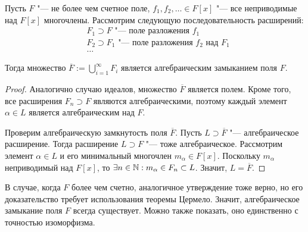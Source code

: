 \begin{proposition}
	Пусть $F$ "--- не более чем счетное поле, $f_1, f_2, \dotsc \in F[x]$ "--- все неприводимые над $F[x]$ многочлены. Рассмотрим следующую последовательность расширений:
	\begin{align*}
		&F_1 \supset F\text{ "--- поле разложения } f_1\\
		&F_2 \supset F_1\text{ "--- поле разложения } f_2 \text{ над } F_1\\
		&\dots
	\end{align*}
	
	Тогда множество $\overline{F} := \bigcup_{i = 1}^\infty F_i$ является алгебраическим замыканием поля $F$.
\end{proposition}

\begin{proof}
	Аналогично случаю идеалов, множество $\overline{F}$ является полем. Кроме того, все расширения $F_n \supset F$ являются алгебраическими, поэтому каждый элемент $\alpha \in L$ является алгебраическим над $F$.
	
	Проверим алгебраическую замкнутость поля $\overline{F}$. Пусть $L \supset \overline{F}$ "--- алгебраическое расширение. Тогда расширение $L \supset F$ "--- тоже алгебраическое. Рассмотрим элемент $\alpha \in L$ и его минимальный многочлен $m_\alpha \in F[x]$. Поскольку $m_\alpha$ неприводимый над $F[x]$, то $\exists n \in \mathbb{N}: m_\alpha \in F_n \subset L$. Значит, $L = \overline{F}$.
\end{proof}

\begin{note}
	В случае, когда $F$ более чем счетно, аналогичное утверждение тоже верно, но его доказательство требует использования теоремы Цермело. Значит, алгебраическое замыкание поля $F$ всегда существует. Можно также показать, оно единственно с точностью изоморфизма.
\end{note}